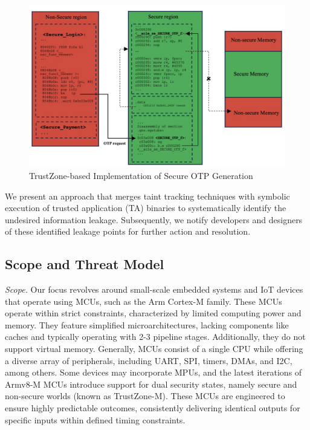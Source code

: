 \begin{figure}
  \centering
  \includegraphics[width=\textwidth]{figures/OTP.jpg}
  \caption{TrustZone-based Implementation of Secure OTP Generation}
  \label{fig:OTP}
\end{figure}

We present an approach that merges taint tracking techniques with symbolic execution of trusted application (\ac{TA}) binaries to systematically identify the undesired information leakage. Subsequently, we notify developers and designers of these identified leakage points for further action and resolution. 

\subsection{Scope and Threat Model}

\textit{Scope.} Our focus revolves around small-scale embedded systems and IoT devices that operate using MCUs, such as the Arm Cortex-M family. These MCUs operate within strict constraints, characterized by limited computing power and memory. They feature simplified microarchitectures, lacking components like caches and typically operating with 2-3 pipeline stages. Additionally, they do not support virtual memory. Generally, MCUs consist of a single CPU while offering a diverse array of peripherals, including UART, SPI, timers, DMAs, and I2C, among others. Some devices may incorporate MPUs, and the latest iterations of Armv8-M MCUs introduce support for dual security states, namely secure and non-secure worlds (known as TrustZone-M). These MCUs are engineered to ensure highly predictable outcomes, consistently delivering identical outputs for specific inputs within defined timing constraints.

